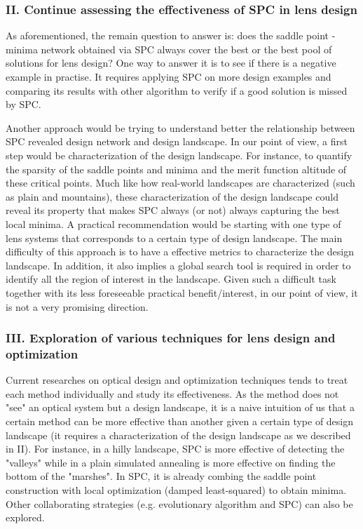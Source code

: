 \subsubsection{II. Continue assessing the effectiveness of SPC in lens design}

As aforementioned, the remain question to answer is: does the saddle point - minima network obtained via SPC always cover the best or the best pool of solutions for lens design? One way to answer it is to see if there is a negative example in practise. It requires applying SPC on more design examples and comparing its results with other algorithm to verify if a good solution is missed by SPC. 

Another approach would be trying to understand better the relationship between SPC revealed design network and design landscape. In our point of view, a first step would be characterization of the design landscape. For instance, to quantify the sparsity of the saddle points and minima and the merit function altitude of these critical points. Much like how real-world landscapes are characterized (such as plain and mountains), these characterization of the design landscape could reveal its property that makes SPC always (or not) always capturing the best local minima. A practical recommendation would be starting with one type of lens systems that corresponds to a certain type of design landscape. The main difficulty of this approach is to have a effective metrics to characterize the design landscape. In addition, it also implies a global search tool is required in order to identify all the region of interest in the landscape. Given such a difficult task together with its less foreseeable practical benefit/interest, in our point of view, it is not a very promising direction. 

\subsubsection{III. Exploration of various techniques for lens design and optimization}

Current researches on optical design and optimization techniques tends to treat each method individually and study its effectiveness. As the method does not "see" an optical system but a design landscape, it is a naive intuition of us that a certain method can be more effective than another given a certain type of design landscape (it requires a characterization of the design landscape as we described in II). For instance, in a hilly landscape, SPC is more effective of detecting the "valleys" while in a plain simulated annealing is more effective on finding the bottom of the "marshes". In SPC, it is already combing the saddle point construction with local optimization (damped least-squared) to obtain minima. Other collaborating strategies (e.g. evolutionary algorithm and SPC) can also be explored.

